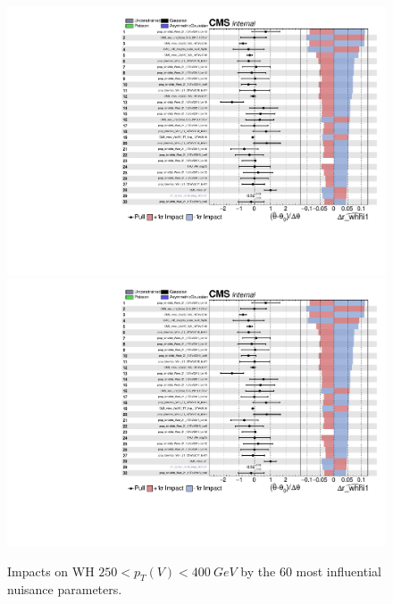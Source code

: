 \begin{figure}
  \centering
  \includegraphics[width=0.85\linewidth,page=1]{figures/impacts/impacts_r_whhi1.pdf}
  \includegraphics[width=0.85\linewidth,page=2]{figures/impacts/impacts_r_whhi1.pdf}
  \caption[Impacts for WH $250 < p_T(V) < \SI{400}{GeV}$]{
    Impacts on WH $250 < p_T(V) < \SI{400}{GeV}$ by the 60 most influential nuisance parameters.
  }
  \label{fig:impacts_r_whhi1}
\end{figure}

